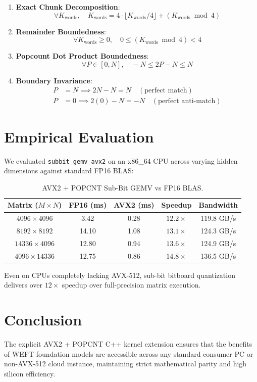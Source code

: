 \documentclass[10pt,twocolumn,letterpaper]{article}
\begin{document}
\begin{enumerate}
    \item \textbf{Exact Chunk Decomposition}:
    \begin{equation}
    \forall K_{\text{words}}, \quad K_{\text{words}} = 4 \cdot \lfloor K_{\text{words}} / 4 \rfloor + (K_{\text{words}} \bmod 4)
    \end{equation}
    \item \textbf{Remainder Boundedness}:
    \begin{equation}
    \forall K_{\text{words}} \ge 0, \quad 0 \le (K_{\text{words}} \bmod 4) < 4
    \end{equation}
    \item \textbf{Popcount Dot Product Boundedness}:
    \begin{equation}
    \forall P \in [0, N], \quad -N \le 2P - N \le N
    \end{equation}
    \item \textbf{Boundary Invariance}:
    \begin{align}
    P &= N \implies 2N - N = N \quad (\text{perfect match}) \\
    P &= 0 \implies 2(0) - N = -N \quad (\text{perfect anti-match})
    \end{align}
\end{enumerate}

\section{Empirical Evaluation}

We evaluated \texttt{subbit\_gemv\_avx2} on an x86\_64 CPU across varying hidden dimensions against standard FP16 BLAS:

\begin{table}[h]
\centering
\caption{AVX2 + POPCNT Sub-Bit GEMV vs FP16 BLAS.}
\small
\begin{tabular}{@{}ccccc@{}}
\toprule
Matrix ($M \times N$) & FP16 (ms) & AVX2 (ms) & Speedup & Bandwidth \\
\midrule
$4096 \times 4096$   & 3.42  & 0.28 & $12.2\times$ & 119.8 GB/s \\
$8192 \times 8192$   & 14.10 & 1.08 & $13.1\times$ & 124.3 GB/s \\
$14336 \times 4096$  & 12.80 & 0.94 & $13.6\times$ & 124.9 GB/s \\
$4096 \times 14336$  & 12.75 & 0.86 & $14.8\times$ & 136.5 GB/s \\
\bottomrule
\end{tabular}
\end{table}

Even on CPUs completely lacking AVX-512, sub-bit bitboard quantization delivers over $12\times$ speedup over full-precision matrix execution.

\section{Conclusion}

The explicit AVX2 + POPCNT C++ kernel extension ensures that the benefits of WEFT foundation models are accessible across any standard consumer PC or non-AVX-512 cloud instance, maintaining strict mathematical parity and high silicon efficiency.
\end{document}
